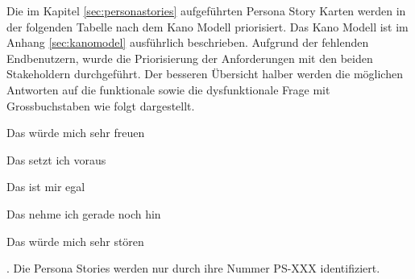 Die im Kapitel \ref{sec:personastories} aufgeführten Persona Story Karten werden in der folgenden Tabelle nach dem Kano Modell priorisiert. Das Kano Modell ist im Anhang \ref{sec:kanomodel} ausführlich beschrieben. Aufgrund der fehlenden Endbenutzern, wurde die Priorisierung der Anforderungen mit den beiden Stakeholdern durchgeführt. Der besseren Übersicht halber werden die möglichen Antworten auf die funktionale sowie die dysfunktionale Frage mit Grossbuchstaben wie folgt dargestellt.
\begin{enumerate*}[label={\Alph*)},font={\color{red!50!black}\bfseries}]
	\item Das würde mich sehr freuen
	\item Das setzt ich voraus
	\item Das ist mir egal
	\item Das nehme ich gerade noch hin
	\item Das würde mich sehr stören
\end{enumerate*}. Die Persona Stories werden nur durch ihre Nummer PS-XXX identifiziert.


